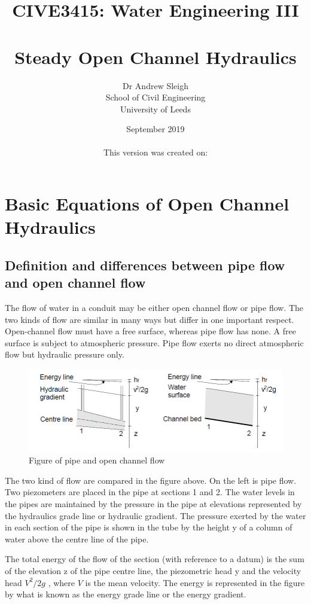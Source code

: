 \documentclass[a4paper, 12pt, british]{article} %
\title{CIVE3415: Water Engineering III\\ \quad \\Steady Open Channel Hydraulics}
\author{Dr Andrew Sleigh\\School of Civil Engineering\\University of Leeds}
\date{September 2019 \\ \quad \\{\scriptsize This version was created on:\\ \DTMnow}}
\numberwithin{equation}{section}
\numberwithin{figure}{section}
\numberwithin{table}{section}
\begin{document}
\maketitle

\tableofcontents


\newpage 
\section{Basic Equations of Open Channel Hydraulics}
\subsection{Definition and differences between pipe flow and open channel flow}

The flow of water in a conduit may be either open channel flow or pipe flow. The two kinds of flow are similar in many ways but differ in one important respect. Open-channel flow must have a free surface, whereas pipe flow has none. A free surface is subject to atmospheric pressure. Pipe flow exerts no direct atmospheric flow but hydraulic pressure only.


\begin{figure}[H]
	\centering
	\includegraphics[scale=0.6]{./images/fig_11.png}
	\caption{Figure of pipe and open channel flow}
	\label{fig:111}
\end{figure}


The two kind of flow are compared in the figure above. On the left is pipe flow. Two piezometers are placed in the pipe at sections 1 and 2. The water levels in the pipes are maintained by the pressure in the pipe at elevations represented by the hydraulics grade line or hydraulic gradient. The pressure exerted by the water in each section of the pipe is shown in the tube by the height y of a column of water above the centre line of the pipe.

The total energy of the flow of the section (with reference to a datum) is the sum of the elevation z of the pipe centre line, the piezometric head y and the velocity head $V^2/2g$ , where $V$ is the mean velocity. The energy is represented in the figure by what is known as the energy grade line or the energy gradient.
\end{document}
